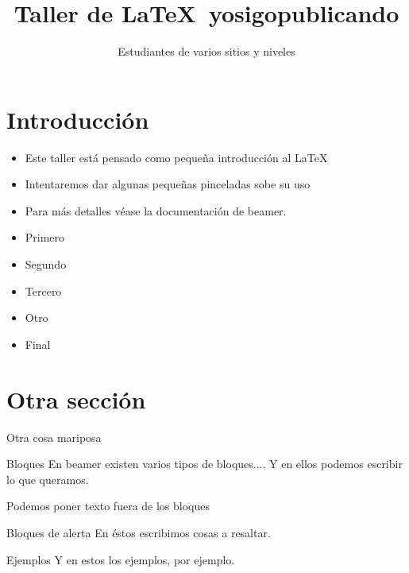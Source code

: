 \documentclass{beamer}
\title[Taller de \LaTeX]{Taller de \LaTeX\ yosigopublicando}
\author[Los presentes]{Estudiantes de varios sitios y niveles}
\institute[UGR]{Universidad de Granada}
\begin{document}
\maketitle


\section*{Introducción}

\begin{frame}
\begin{itemize}[<+-|alert@+>]
\item Este taller está pensado como pequeña introducción al \LaTeX 

\item Intentaremos dar algunas pequeñas pinceladas sobe su uso 

\item Para m\'as detalles véase la documentación de beamer.
\end{itemize}
\end{frame}

\begin{frame}
\begin{itemize}
\item<1-> Primero
\item<2-> Segundo
\item<3,4>Tercero
\item<2> Otro
\item<5-> Final
\end{itemize}
\end{frame}

\section{Otra sección}

\begin{frame}{Otra cosa mariposa}
\begin{block}{Bloques}
En beamer existen varios tipos de bloques....
Y en ellos podemos escribir lo que queramos.
\end{block}

Podemos poner texto fuera de los bloques

\begin{alertblock}{Bloques de alerta}
En éstos escribimos cosas a resaltar.
\end{alertblock}

\begin{exampleblock}{Ejemplos}
Y en estos los ejemplos, por ejemplo.
\end{exampleblock}

\end{frame}
\end{document}

